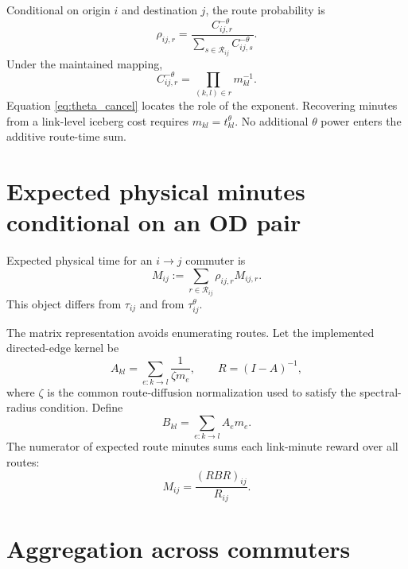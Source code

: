 \documentclass[12pt]{article}
\newcommand{\R}{\mathcal R}
\begin{document}
Conditional on origin $i$ and destination $j$, the route probability is
\begin{equation}
  \rho_{ij,r}
  =\frac{C_{ij,r}^{-\theta}}
  {\sum_{s\in\R_{ij}}C_{ij,s}^{-\theta}}.
  \label{eq:route_probability}
\end{equation}
Under the maintained mapping,
\begin{equation}
  C_{ij,r}^{-\theta}
  =\prod_{(k,l)\in r}m_{kl}^{-1}.
  \label{eq:theta_cancel}
\end{equation}
Equation \eqref{eq:theta_cancel} locates the role of the exponent. Recovering
minutes from a link-level iceberg cost requires $m_{kl}=t_{kl}^{\theta}$.
No additional $\theta$ power enters the additive route-time sum.

\section{Expected physical minutes conditional on an OD pair}

Expected physical time for an $i\to j$ commuter is
\begin{equation}
  M_{ij}
  :=\sum_{r\in\R_{ij}}\rho_{ij,r}M_{ij,r}.
  \label{eq:expected_od_minutes}
\end{equation}
This object differs from $\tau_{ij}$ and from $\tau_{ij}^{\theta}$.

The matrix representation avoids enumerating routes. Let the implemented
directed-edge kernel be
\begin{equation}
  A_{kl}
  =\sum_{e:k\to l}\frac{1}{\zeta m_e},
  \qquad
  R=(I-A)^{-1},
  \label{eq:resolvent}
\end{equation}
where $\zeta$ is the common route-diffusion normalization used to satisfy the
spectral-radius condition. Define
\begin{equation}
  B_{kl}
  =\sum_{e:k\to l}A_e m_e.
  \label{eq:reward_matrix}
\end{equation}
The numerator of expected route minutes sums each link-minute reward over all
routes:
\begin{equation}
  M_{ij}
  =\frac{(RBR)_{ij}}{R_{ij}}.
  \label{eq:matrix_minutes}
\end{equation}

\section{Aggregation across commuters}
\end{document}
